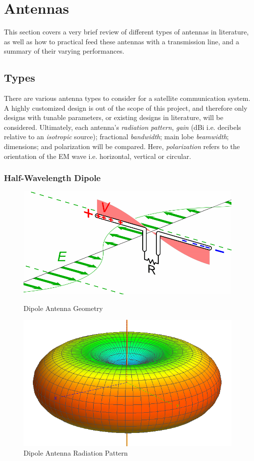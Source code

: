 \graphicspath{{./figures}}

\section{Antennas}\label{sec:antenna_theory}

This section covers a very brief review of different types of antennas in literature, as well as how to practical feed these antennas with a transmission line, and a summary of their varying performances.

\subsection{Types}\label{sec:antenna_types}
There are various antenna types to consider for a satellite communication system. A highly customized design is out of the scope of this project, and therefore only designs with tunable parameters, or existing designs in literature, will be considered. Ultimately, each antenna's \textit{radiation pattern}, \textit{gain} (dBi i.e. decibels relative to an \textit{isotropic} source); fractional \textit{bandwidth}; main lobe \textit{beamwidth}; dimensions; and polarization will be compared. Here, \textit{polarization} refers to the orientation of the EM wave i.e. horizontal, vertical or circular.

\subsubsection{Half-Wavelength Dipole}

\begin{figure}[!htb]
  \begin{minipage}{.49\textwidth}
    \centering
    \includegraphics[width=0.8\linewidth]{dipole_geometry}
    \caption{Dipole Antenna Geometry}
    \label{fig:dipole_geometry}
  \end{minipage}
  \begin{minipage}{.49\textwidth}
    \centering
    \includegraphics[width=0.6\linewidth]{dipole_pattern}
    \caption{Dipole Antenna Radiation Pattern}
    \label{fig:dipole_pattern}
  \end{minipage}
\end{figure}

